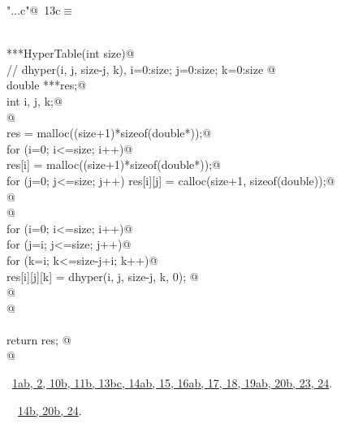\documentclass[reqno]{amsart}
\renewcommand{\NWtarget}[2]{\hypertarget{#1}{#2}}
\renewcommand{\NWlink}[2]{\hyperlink{#1}{#2}}
\begin{document}
\begin{flushleft} \small\label{scrap22}\raggedright\small
\NWtarget{nuweb13c}{} \verb@"..\src\ReprodCalcs.c"@\nobreak\ {\footnotesize {13c}}$\equiv$
\vspace{-1ex}
\begin{list}{}{} \item
\mbox{}\verb@@\\
\mbox{}\verb@double ***HyperTable(int size){@\\
\mbox{}\verb@// dhyper(i, j, size-j, k), i=0:size; j=0:size; k=0:size        @\\
\mbox{}\verb@ double ***res;@\\
\mbox{}\verb@ int i, j, k;@\\
\mbox{}\verb@ @\\
\mbox{}\verb@ res = malloc((size+1)*sizeof(double*));@\\
\mbox{}\verb@ for (i=0; i<=size; i++){@\\
\mbox{}\verb@         res[i] = malloc((size+1)*sizeof(double*));@\\
\mbox{}\verb@         for (j=0; j<=size; j++) res[i][j] = calloc(size+1, sizeof(double));@\\
\mbox{}\verb@ }@\\
\mbox{}\verb@ @\\
\mbox{}\verb@ for (i=0; i<=size; i++){@\\
\mbox{}\verb@         for (j=i; j<=size; j++){@\\
\mbox{}\verb@                 for (k=i; k<=size-j+i; k++)@\\
\mbox{}\verb@                         res[i][j][k] = dhyper(i, j, size-j, k, 0); @\\
\mbox{}\verb@                 }@\\
\mbox{}\verb@         }@\\
\mbox{}\verb@@\\
\mbox{}\verb@ return res;    @\\
\mbox{}\verb@}@\\
\mbox{}\verb@@{\NWsep}
\end{list}
\vspace{-1.5ex}
\footnotesize
\begin{list}{}{\setlength{\itemsep}{-\parsep}\setlength{\itemindent}{-\leftmargin}}
\item \NWtxtFileDefBy\ \NWlink{nuweb1a}{1a}\NWlink{nuweb1b}{b}\NWlink{nuweb2}{, 2}\NWlink{nuweb10b}{, 10b}\NWlink{nuweb11b}{, 11b}\NWlink{nuweb13b}{, 13b}\NWlink{nuweb13c}{c}\NWlink{nuweb14a}{, 14a}\NWlink{nuweb14b}{b}\NWlink{nuweb15}{, 15}\NWlink{nuweb16a}{, 16a}\NWlink{nuweb16b}{b}\NWlink{nuweb17}{, 17}\NWlink{nuweb18}{, 18}\NWlink{nuweb19a}{, 19a}\NWlink{nuweb19b}{b}\NWlink{nuweb20b}{, 20b}\NWlink{nuweb23}{, 23}\NWlink{nuweb24}{, 24}.
\item \NWtxtIdentsDefed\nobreak\  \verb@HyperTable@\nobreak\ \NWlink{nuweb14b}{14b}\NWlink{nuweb20b}{, 20b}\NWlink{nuweb24}{, 24}.
\item{}
\end{list}
\vspace{4ex}
\end{flushleft}
\end{document}
